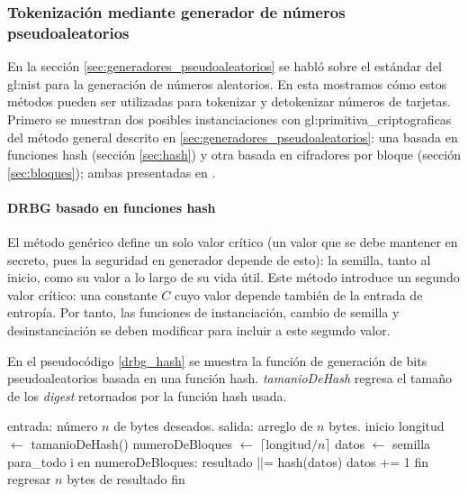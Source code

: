 %
%
%

\subsubsection{Tokenización mediante generador de números pseudoaleatorios}
\label{drbg_lista}

En la sección \ref{sec:generadores_pseudoaleatorios} se habló sobre el
estándar del \gls{gl:nist} para la generación de números aleatorios. En esta
mostramos cómo estos métodos pueden ser utilizadas para tokenizar y detokenizar
números de tarjetas. Primero se muestran dos posibles instanciaciones
con \glspl{gl:primitiva_criptografica} del método general descrito en
\ref{sec:generadores_pseudoaleatorios}: una basada en funciones hash
(sección \ref{sec:hash}) y otra basada en cifradores por bloque (sección
\ref{sec:bloques}); ambas presentadas en \cite{nist_aleatorios}.

\paragraph{DRBG basado en funciones hash}

El método genérico define un solo valor crítico (un valor que se debe mantener
en secreto, pues la seguridad en generador depende de esto): la semilla, tanto
al inicio, como su valor a lo largo de su vida útil. Este método introduce
un segundo valor crítico: una constante $ C $ cuyo valor depende también de
la entrada de entropía. Por tanto, las funciones de instanciación,
cambio de semilla y desinstanciación se deben modificar para incluir
a este segundo valor.

En el pseudocódigo \ref{drbg_hash} se muestra la función de generación de bits
pseudoaleatorios basada en una función hash. \textit{tamanioDeHash} regresa el
tamaño de los \textit{digest} retornados por la función hash usada.

\begin{pseudocodigo}[%
    caption={Generación de bits pseudoaleatorios mediante función hash},
    label={drbg_hash}%
  ]
    entrada: número $ n $ de bytes deseados.
    salida:  arreglo de $ n $ bytes.
    inicio
      longitud $ \gets $ tamanioDeHash()
      numeroDeBloques $ \gets $ $ \lceil \text{longitud} / n \rceil $
      datos $ \gets $ semilla
      para_todo i en numeroDeBloques:
        resultado ||= hash(datos)
        datos += 1
      fin
      regresar $ n $ bytes de resultado
    fin
\end{pseudocodigo}


